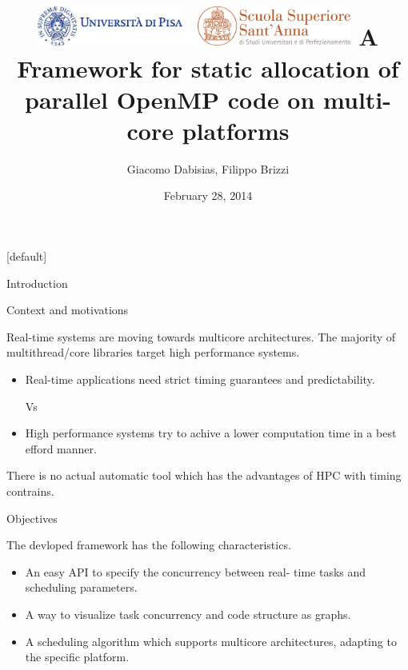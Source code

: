 \documentclass[xcolor=dvipsnames]{beamer}
\title[framework]{\includegraphics[height=1.3cm]{unipiinit2}\includegraphics[width=0.5cm]{space}\includegraphics[height=1.3cm]{annainit}\newline \newline
A Framework for static allocation of parallel OpenMP code on multi-core platforms\\}
\author[]{Giacomo Dabisias, Filippo Brizzi}
\institute[unipi]{
  Universit\`a degli studi di Pisa,\\
  Scuola Superiore Sant'Anna\\
  Pisa,Italy\\[1ex]

}
\date[February 2014]{February 28, 2014}
\makeatletter
\newenvironment{withoutheadline}{
        \setbeamertemplate{headline}[default]
        \def\beamer@entrycode{\vspace*{-\headheight}}
    }{}
\makeatother
\begin{document}
\begin{withoutheadline}
\begin{frame}
  \titlepage
\end{frame}
\end{withoutheadline}

\begin{section}{Introduction}





\begin{frame}{\hskip 0.3cm Context and motivations}

Real-time systems are moving towards multicore architectures. The majority of multithread/core libraries target high performance systems. 

\begin{itemize}

\item Real-time applications need strict timing guarantees and predictability.

 \begin{center} Vs \end{center}

\item High performance systems try to achive a lower computation time in a best efford manner.

\end{itemize}

There is no actual automatic tool which has the advantages of HPC with timing contrains.

\end{frame}








\begin{frame}{\hskip 0.3cm Objectives}

The devloped framework has the following characteristics.

\begin{itemize}

\item An easy API to specify the concurrency between real- time tasks and scheduling parameters.

\item A way to visualize task concurrency and code structure as graphs.

\item A scheduling algorithm which supports multicore architectures, adapting to
the specific platform.


\end{itemize}
\end{frame}
\end{section}
\end{document}
